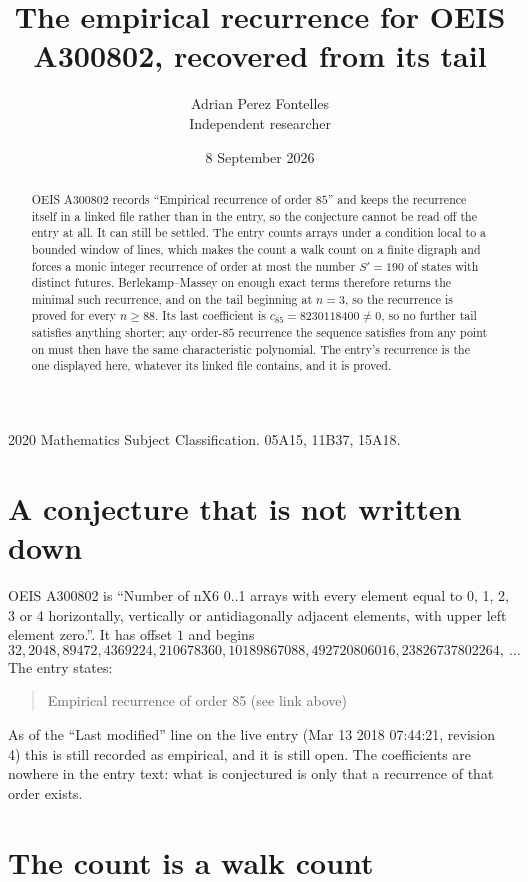 \documentclass[11pt,a4paper]{article}
\title{The empirical recurrence for OEIS A300802, recovered from its tail}
\author{Adrian Perez Fontelles\\ \small Independent researcher}
\date{8 September 2026}
\theoremstyle{plain}
\theoremstyle{definition}
\begin{document}
\maketitle

\begin{abstract}
OEIS A300802 records ``Empirical recurrence of order $85$'' and keeps the recurrence itself in
a linked file rather than in the entry, so the conjecture cannot be read off the entry at all.
It can still be settled. The entry counts arrays under a condition local to a bounded window of
lines, which makes the count a walk count on a finite digraph and forces a monic integer
recurrence of order at most the number $S'=190$ of states with distinct futures. Berlekamp--Massey on
enough exact terms therefore returns the minimal such recurrence, and on the tail beginning at $n=3$, so the recurrence is proved for every $n\ge88$.
Its last coefficient is $c_{85}=8230118400\neq0$, so no further tail satisfies anything
shorter; any order-$85$ recurrence the sequence satisfies from any point on must then have
the same characteristic polynomial. The entry's recurrence is the one displayed here, whatever
its linked file contains, and it is proved.
\end{abstract}

\noindent\small 2020 Mathematics Subject Classification. 05A15, 11B37, 15A18.\normalsize

\section{A conjecture that is not written down}

OEIS A300802 is ``Number of nX6 0..1 arrays with every element equal to 0, 1, 2, 3 or 4 horizontally, vertically or antidiagonally adjacent elements, with upper left element zero.''. It has offset $1$ and begins
\[
32, 2048, 89472, 4369224, 210678360, 10189867088, 492720806016, 23826737802264,\ \dots
\]
The entry states:
\begin{quote}
Empirical recurrence of order 85 (see link above)
\end{quote}
As of the ``Last modified'' line on the live entry (Mar 13 2018 07:44:21, revision 4)
this is still recorded as empirical, and it is still open. The coefficients are nowhere in the
entry text: what is conjectured is only that a recurrence of that order exists.

\section{The count is a walk count}
\end{document}
